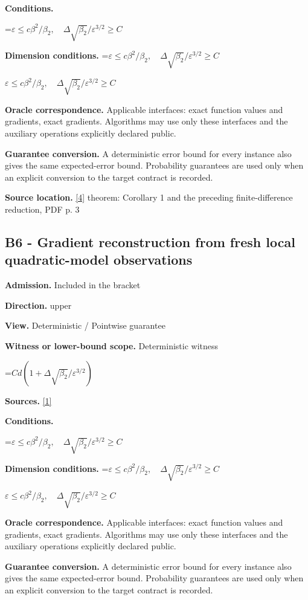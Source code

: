 \documentclass[10pt,a4paper]{article}
\newcommand{\AtlasMath}[1]{\par\begingroup\centering\setbox0=\hbox{$\displaystyle #1$}\ifdim\wd0>1.4\linewidth\typeout{ATLAS WIDE FORMULA: \the\wd0}\fi\ifdim\wd0>\linewidth\resizebox{\linewidth}{!}{\box0}\else\box0\fi\par\endgroup}
\newcommand{\AtlasInlineMath}[1]{\begingroup\setbox0=\hbox{$#1$}\ifdim\wd0>.4\linewidth\endgroup\AtlasMath{#1}\else\endgroup$#1$\fi}
\begin{document}
\textbf{Conditions.} 
\AtlasMath{\varepsilon\le c\beta^2/\beta_2,\quad\Delta\sqrt{\beta_2}/\varepsilon^{3/2}\ge C}


\textbf{Dimension conditions.} \AtlasInlineMath{\varepsilon\le c\beta^2/\beta_2,\quad\Delta\sqrt{\beta_2}/\varepsilon^{3/2}\ge C}

\textbf{Oracle correspondence.} Applicable interfaces: exact function values and gradients, exact gradients. Algorithms may use only these interfaces and the auxiliary operations explicitly declared public.

\textbf{Guarantee conversion.} A deterministic error bound for every instance also gives the same expected-error bound. Probability guarantees are used only when an explicit conversion to the target contract is recorded.

\textbf{Source location.} \href{https://arxiv.org/pdf/2510.20786}{[4]} theorem: Corollary 1 and the preceding finite-difference reduction, PDF p. 3

\subsection{B6 - Gradient reconstruction from fresh local quadratic-model observations}
\textbf{Admission.} Included in the bracket

\textbf{Direction.} upper

\textbf{View.} Deterministic / Pointwise guarantee

\textbf{Witness or lower-bound scope.} Deterministic witness

\AtlasMath{Cd(1+\Delta\sqrt{\beta_2}/\varepsilon^{3/2})}
\textbf{Sources.} \href{https://arxiv.org/pdf/2610.02791}{[1]}

\textbf{Conditions.} 
\AtlasMath{\varepsilon\le c\beta^2/\beta_2,\quad\Delta\sqrt{\beta_2}/\varepsilon^{3/2}\ge C}


\textbf{Dimension conditions.} \AtlasInlineMath{\varepsilon\le c\beta^2/\beta_2,\quad\Delta\sqrt{\beta_2}/\varepsilon^{3/2}\ge C}

\textbf{Oracle correspondence.} Applicable interfaces: exact function values and gradients, exact gradients. Algorithms may use only these interfaces and the auxiliary operations explicitly declared public.

\textbf{Guarantee conversion.} A deterministic error bound for every instance also gives the same expected-error bound. Probability guarantees are used only when an explicit conversion to the target contract is recorded.
\end{document}
